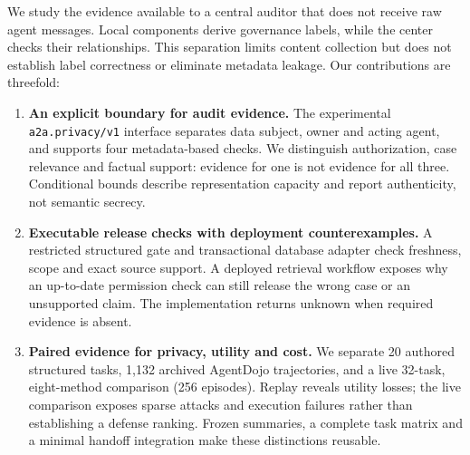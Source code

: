 \documentclass[11pt]{article}
\newcommand{\ext}{\texttt{a2a.privacy/v1}}
\begin{document}
We study the evidence available to a central auditor that does not receive raw
agent messages. Local components derive governance labels, while the center
checks their relationships. This separation limits content collection but does
not establish label correctness or eliminate metadata leakage. Our contributions
are threefold:
\begin{enumerate}
\item \textbf{An explicit boundary for audit evidence.} The experimental
\ext{} interface separates data subject, owner and acting agent, and supports
four metadata-based checks. We distinguish authorization, case relevance and
factual support: evidence for one is not evidence for all three. Conditional
bounds describe representation capacity and report authenticity, not semantic secrecy.
\item \textbf{Executable release checks with deployment counterexamples.}
A restricted structured gate and transactional database adapter check freshness,
scope and exact source support. A deployed retrieval workflow exposes why an
up-to-date permission check can still release the wrong case or an unsupported
claim. The implementation returns unknown when required evidence is absent.
\item \textbf{Paired evidence for privacy, utility and cost.} We separate
20 authored structured tasks, 1,132 archived AgentDojo trajectories, and a live
32-task, eight-method comparison (256 episodes). Replay reveals utility losses;
the live comparison exposes sparse attacks and execution failures rather than
establishing a defense ranking. Frozen summaries, a complete task matrix and a
minimal handoff integration make these distinctions reusable.
\end{enumerate}



\clearpage
\appendix






\begingroup
\let\savedtable\table
\renewcommand{\table}[1][]{\savedtable[H]}

\endgroup
\FloatBarrier
\begingroup
\let\savedfigure\figure
\renewcommand{\figure}[1][]{\savedfigure[H]}


\endgroup
\FloatBarrier



\end{document}
